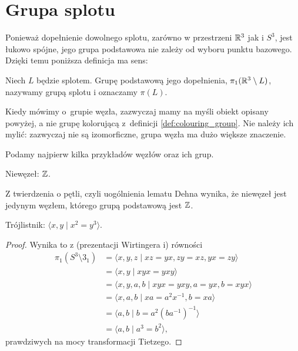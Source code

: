 \section{Grupa splotu}
Ponieważ dopełnienie dowolnego splotu, zarówno w przestrzeni $\mathbb R^3$ jak i $S^3$, jest łukowo spójne, jego grupa podstawowa nie zależy od wyboru punktu bazowego.
Dzięki temu poniższa definicja ma sens:

\begin{definition}
    Niech $L$ będzie splotem.
    Grupę podstawową jego dopełnienia, $\pi_1(\mathbb R^3 \setminus L)$, nazywamy grupą splotu i oznaczamy $\pi(L)$.
\end{definition}

Kiedy mówimy o~grupie węzła, zazwyczaj mamy na myśli obiekt opisany powyżej, a nie grupę kolorującą z~definicji \ref{def:colouring_group}.
Nie należy ich mylić: zazwyczaj nie są izomorficzne, grupa węzła ma dużo większe znaczenie.

Podamy najpierw kilka przykładów węzłów oraz ich grup.

\begin{example}
    Niewęzeł: $\mathbb Z$.
\end{example}

Z twierdzenia o pętli, czyli uogólnienia lematu Dehna wynika, że niewęzeł jest jedynym węzłem, którego grupą podstawową jest $\mathbb Z$.

\begin{example}
    \label{exm:trefoil_group}
    Trójlistnik: $\langle x, y \mid x^2 = y^3\rangle$.
\end{example}

\begin{proof}
    Wynika to z (prezentacji Wirtingera i) równości
    \begin{align}
        \pi_1(S^3 \setminus 3_1) & = \langle x, y, z \mid xz = yx, zy = xz, yx = zy \rangle \\
                                 & = \langle x, y \mid xyx = yxy \rangle \\
                                 & = \langle x, y, a, b \mid xyx = yxy, a = yx, b = xyx \rangle \\
                                 & = \langle x, a, b \mid xa = a^2x^{-1}, b = xa \rangle \\
                                 & = \langle a, b \mid b = a^2(ba^{-1})^{-1} \rangle \\
                                 & = \langle a, b \mid a^3 = b^2 \rangle,
    \end{align}
    prawdziwych na mocy transformacji Tietzego.
\end{proof}

